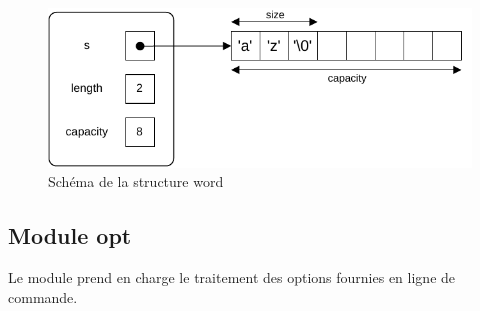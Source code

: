 \documentclass[a4paper, 12pt]{article}
\newcommand{\code}{\commandbox}
\begin{document}
\begin{figure}[H]
    \centering
    \begin{tcolorbox}[enhanced,
        colback=white,
        colframe=blue!45!white,
        fonttitle=\bfseries,
        title=Schéma,
        boxrule=2pt,
        width=0.8\textwidth]
        \includegraphics[width=\textwidth]{word_schema.pdf}
    \end{tcolorbox}
    \caption{Schéma de la structure word}
    \label{fig:word_schema}
\end{figure}

\subsection{Module opt}

Le module \code{opt} prend en charge le traitement des options fournies en ligne de commande.
\end{document}
